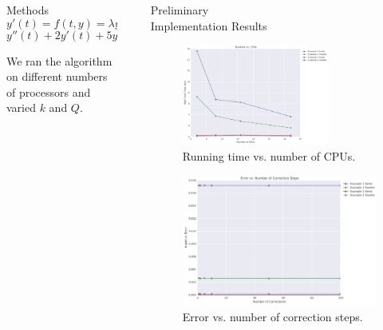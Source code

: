 \documentclass[final]{beamer}
\newlength{\sepwid}
\newlength{\onecolwid}
\begin{document}
\begin{frame}[t]
\begin{columns}[t]
\begin{column}{\onecolwid}
\begin{block}{Methods}
\[
y'(t) = f(t, y) = \lambda y, \, y(0) = 1
\]
\[
y''(t) + 2y'(t) + 5y(t) = 0, \, y(0) = 1 \, y'(0) = 0.
\]

We ran the algorithm on different numbers of processors and varied $k$ and $Q$. 

\end{block}



\end{column} %

\begin{column}{\sepwid}\end{column}

\begin{column}{\onecolwid} %


\begin{block}{Preliminary \\ Implementation Results}

\begin{figure}
\includegraphics[width=0.75\textwidth]{../data/runtime_vs_cpus.pdf}
\caption{Running time vs. number of CPUs.}
\label{fig:run_v_cpu}
\end{figure}

\begin{figure}
\includegraphics[width=0.75\linewidth]{../data/error_vs_corrections.pdf}
\caption{Error vs. number of correction steps.}
\label{fig:err_v_k}
\end{figure}


\end{block}
\end{column}
\end{columns}
\end{frame}
\end{document}
